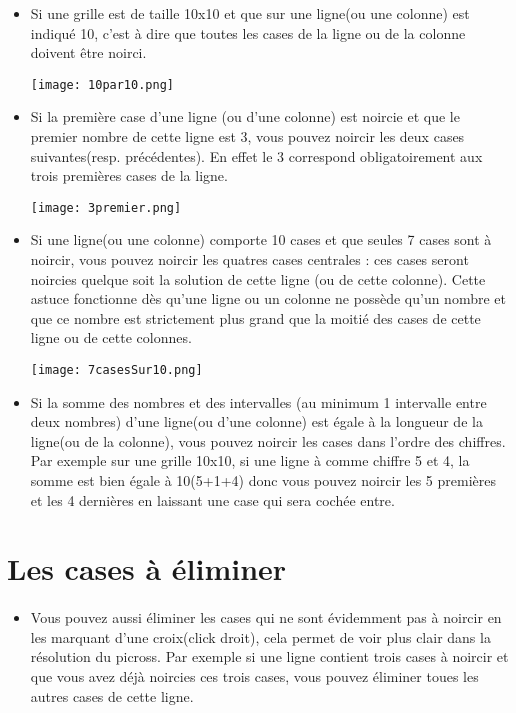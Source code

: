 	\begin{itemize}
		\item Si une grille est de taille 10x10 et que sur une ligne(ou une colonne) est indiqué 10, c'est à dire que toutes les cases de la ligne ou de la colonne doivent être noirci.\\

	\begin{center}
		\texttt{[image: 10par10.png]}\\
	\end{center}

		\item Si la première case d'une ligne (ou d'une colonne) est noircie et que le premier nombre de cette ligne est 3, vous pouvez noircir les deux cases suivantes(resp. précédentes). En effet le 3 correspond obligatoirement aux trois premières cases de la ligne.\\
	\begin{center}
		\texttt{[image: 3premier.png]}\\
	\end{center}
\newpage
		\item Si une ligne(ou une colonne) comporte 10 cases et que seules 7 cases sont à noircir, vous pouvez noircir les quatres cases centrales : ces cases seront noircies quelque soit la solution de cette ligne (ou de cette colonne). Cette astuce fonctionne dès qu'une ligne ou un colonne ne possède qu'un nombre et que ce nombre est strictement plus grand que la moitié des cases de cette ligne ou de cette colonnes.\\

	\begin{center}
		\texttt{[image: 7casesSur10.png]}
	\end{center}
		
		\item Si la somme des nombres et des intervalles (au minimum 1 intervalle entre deux nombres) d'une ligne(ou d'une colonne) est égale à la longueur de la ligne(ou de la colonne), vous pouvez noircir les cases dans l'ordre des chiffres. Par exemple sur une grille 10x10, si une ligne à comme chiffre 5 et 4, la somme est bien égale à 10(5+1+4) donc vous pouvez noircir les 5 premières et les 4 dernières en laissant une case qui sera cochée entre.\\    
	\end{itemize}

\section{Les cases à éliminer}
	\paragraph{}
	\begin{itemize}
		\item Vous pouvez aussi éliminer les cases qui ne sont évidemment pas à noircir en les marquant d'une croix(click droit), cela permet de voir plus clair dans la résolution du picross. Par exemple si une ligne contient trois cases à noircir et que vous avez déjà noircies ces trois cases, vous pouvez éliminer toues les autres cases de cette ligne.
	\end{itemize}
 
